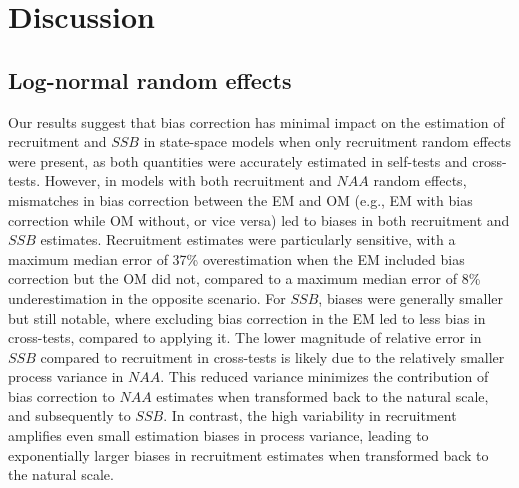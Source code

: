 \documentclass[
  12pt,
]{article}
\begin{document}
\hypertarget{discussion}{%
\section{Discussion}\label{discussion}}

\hypertarget{log-normal-random-effects}{%
\subsection{Log-normal random effects}\label{log-normal-random-effects}}

Our results suggest that bias correction has minimal impact on the
estimation of recruitment and \(SSB\) in state-space models when only
recruitment random effects were present, as both quantities were
accurately estimated in self-tests and cross-tests. However, in models
with both recruitment and \(NAA\) random effects, mismatches in bias
correction between the EM and OM (e.g., EM with bias correction while OM
without, or vice versa) led to biases in both recruitment and \(SSB\)
estimates. Recruitment estimates were particularly sensitive, with a
maximum median error of 37\% overestimation when the EM included bias
correction but the OM did not, compared to a maximum median error of 8\%
underestimation in the opposite scenario. For \(SSB\), biases were
generally smaller but still notable, where excluding bias correction in
the EM led to less bias in cross-tests, compared to applying it. The
lower magnitude of relative error in \(SSB\) compared to recruitment in
cross-tests is likely due to the relatively smaller process variance in
\(NAA\). This reduced variance minimizes the contribution of bias
correction to \(NAA\) estimates when transformed back to the natural
scale, and subsequently to \(SSB\). In contrast, the high variability in
recruitment amplifies even small estimation biases in process variance,
leading to exponentially larger biases in recruitment estimates when
transformed back to the natural scale.
\end{document}
